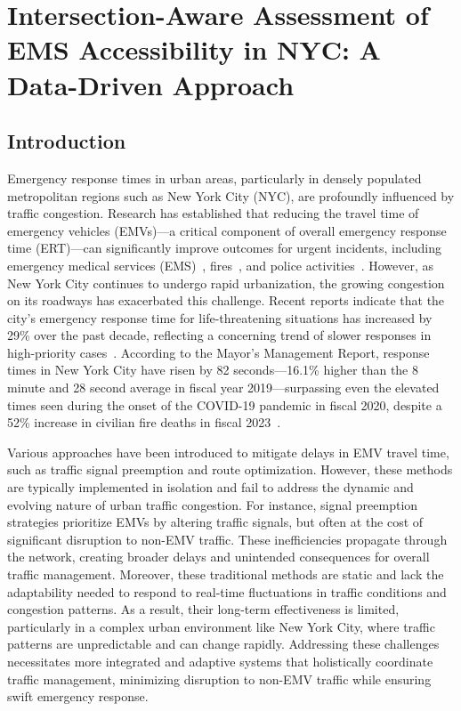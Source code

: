 \chapter{Intersection-Aware Assessment of EMS Accessibility in NYC: A Data-Driven Approach}\label{chap:ems_accessibility}

\section{Introduction}

\label{sec:introduction_access}
Emergency response times in urban areas, particularly in densely populated metropolitan regions such as New York City (NYC), are profoundly influenced by traffic congestion. Research has established that reducing the travel time of emergency vehicles (EMVs)—a critical component of overall emergency response time (ERT)—can significantly improve outcomes for urgent incidents, including emergency medical services (EMS)~\cite{blackwell2002response, SCHUSTER2024104017}, fires~\cite{jaldell2017important,challands2010relationships}, and police activities~\cite{blanes2018effect}. However, as New York City continues to undergo rapid urbanization, the growing congestion on its roadways has exacerbated this challenge. Recent reports indicate that the city's emergency response time for life-threatening situations has increased by 29\% over the past decade, reflecting a concerning trend of slower responses in high-priority cases~\cite{EMS1_NYC_Response_Times}. According to the Mayor’s Management Report, response times in New York City have risen by 82 seconds—16.1\% higher than the 8 minute and 28 second average in fiscal year 2019—surpassing even the elevated times seen during the onset of the COVID-19 pandemic in fiscal 2020, despite a 52\% increase in civilian fire deaths in fiscal 2023~\cite{NYPost_Response_Times_2023}.

Various approaches have been introduced to mitigate delays in EMV travel time, such as traffic signal preemption and route optimization. However, these methods are typically implemented in isolation and fail to address the dynamic and evolving nature of urban traffic congestion. For instance, signal preemption strategies prioritize EMVs by altering traffic signals, but often at the cost of significant disruption to non-EMV traffic. These inefficiencies propagate through the network, creating broader delays and unintended consequences for overall traffic management. Moreover, these traditional methods are static and lack the adaptability needed to respond to real-time fluctuations in traffic conditions and congestion patterns. As a result, their long-term effectiveness is limited, particularly in a complex urban environment like New York City, where traffic patterns are unpredictable and can change rapidly. Addressing these challenges necessitates more integrated and adaptive systems that holistically coordinate traffic management, minimizing disruption to non-EMV traffic while ensuring swift emergency response. 

